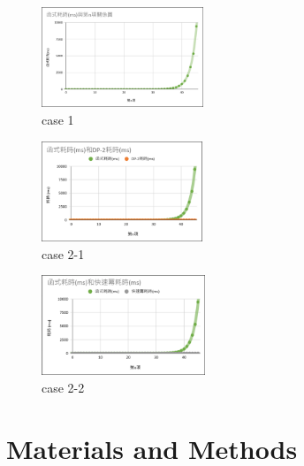 \begin{minipage}{\linewidth}
    \centering
    \begin{minipage}{0.32\linewidth}
        \begin{figure}[H]
            \includegraphics[height=3cm]{picture/fib_re_graph.png}
            \caption{case 1}
        \end{figure}
    \end{minipage}
    \begin{minipage}{0.32\linewidth}
        \begin{figure}[H]
            \includegraphics[height=3cm]{picture/fib_re_vs_dp.png}
            \caption{case 2-1}
        \end{figure}
    \end{minipage}
    \begin{minipage}{0.32\linewidth}
        \begin{figure}[H]
            \includegraphics[height=3cm]{picture/fib_re_vs_pow.png}
            \caption{case 2-2}
        \end{figure}
    \end{minipage}
\end{minipage}

\section{Materials and Methods}
